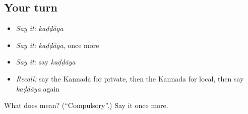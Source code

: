 \subsection*{Your turn}
\begin{itemize}
\raggedright
  \item \emph{Say it:} \emph{kaḍḍāya}
  \item \emph{Say it:} \emph{kaḍḍāya}, once more
  \item \emph{Say it:} say \emph{kaḍḍāya}
  \item \emph{Recall:} say the Kannada for private, then the Kannada for local, then say \emph{kaḍḍāya} again
\end{itemize}

\begin{tcolorbox}[breakable,colback=teal!4,colframe=teal!35!black,title={Before you move on}]
What does  mean? (\textquotedblleft{}Compulsory\textquotedblright{}.) Say it once more.
\end{tcolorbox}
